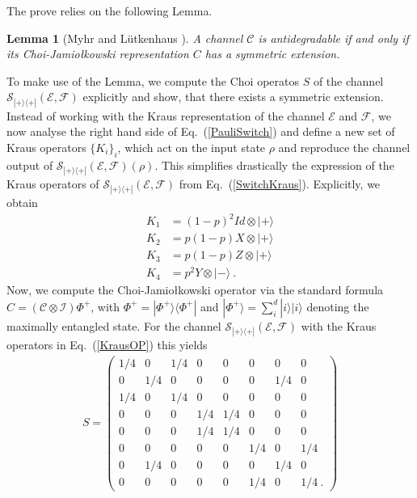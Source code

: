 \documentclass[aps,prl,twocolumn,superscriptaddress,groupedaddress]{revtex4}
\newtheorem{lemma}[theorem]{Lemma}
\def\>{\rangle}
\def\<{\langle}
\newcommand{\map}[1]{\mathcal{#1}}
\begin{document}
The prove relies on the following Lemma.
\begin{lemma}[Myhr and L{\"u}tkenhaus \cite{myhr2009spectrum}]
A channel $\map C$ is antidegradable if and only if its Choi-Jamio\l kowski representation $C$ has a symmetric extension.
\end{lemma}
To make use of the Lemma, we compute the Choi operatos $S$ of the channel $\map S_{|+\>\<+|}(\map E, \map F)$ explicitly and show, that there exists a symmetric extension. Instead of working with the Kraus representation of the channel $\map E$ and $\map F$, we now analyse the right hand side of Eq.~(\ref{PauliSwitch}) and define a new set of Kraus operators $\lbrace K_i \rbrace_i$, which act on the input state $\rho$ and reproduce the channel output of $\map S_{|+\>\<+|}(\map E, \map F)(\rho)$. This simplifies drastically the expression of the Kraus operators of $\map S_{|+\>\<+|}(\map E, \map F)$ from Eq.~(\ref{SwitchKraus}). Explicitly, we obtain
\begin{align} \label{KrausOP}
K_1 &=(1-p)^2 Id \otimes |+\> \nonumber \\
K_2 &= p(1-p) X \otimes |+\> \nonumber \\
K_3 &= p(1-p) Z \otimes |+\> \nonumber \\
K_4 &= p^2 Y \otimes |-\> \nonumber \ . 
\end{align}
Now, we compute the Choi-Jamio\l kowski operator via the standard formula $C = (\map C \otimes \map I) \Phi^+$, with $\Phi^+ = |\Phi^+\>\<\Phi^+|$ and $|\Phi^+\>= \sum_i^d |i\>|i\>$ denoting the maximally entangled state. For the channel $\map S_{|+\>\<+|}(\map E, \map F)$ with the Kraus operators in Eq.~(\ref{KrausOP}) this yields
\begin{align}
S= \begin{pmatrix}
 1/4 & 0 & 1/4 & 0 & 0 & 0 & 0 & 0\\
 0 & 1/4 & 0 & 0 & 0 & 0 & 1/4 & 0 \\
 1/4 & 0 & 1/4 & 0 & 0 & 0 & 0 & 0\\
 0 & 0 & 0 & 1/4 & 1/4 & 0 & 0 & 0 \\
 0 & 0 & 0 & 1/4 & 1/4 & 0 & 0 & 0 \\
 0 & 0 & 0 & 0 & 0 & 1/4 & 0 & 1/4 \\
 0& 1/4 & 0 & 0 & 0 & 0 & 1/4 & 0 \\
 0 & 0 & 0 & 0 & 0 & 1/4 & 0 & 1/4 \ .
\end{pmatrix}
\end{align}
\fi
\end{document}
